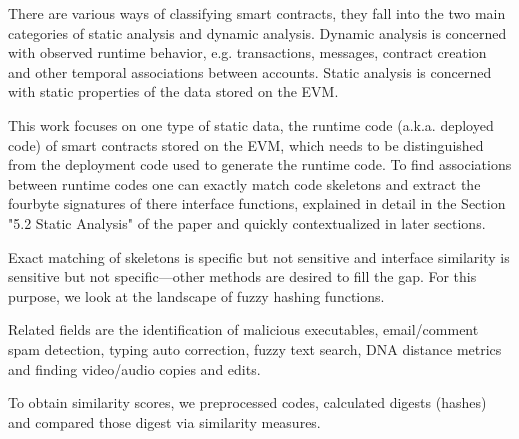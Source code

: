 \documentclass[../main.tex]{subfiles}
\begin{document}
There are various ways of classifying smart contracts, they fall into the two main categories of
static analysis and dynamic analysis.
Dynamic analysis is concerned with observed runtime behavior, e.g. transactions, messages, contract creation and other temporal associations between accounts.
Static analysis is concerned with static properties of the data stored on the EVM.

This work focuses on one type of static data, the runtime code (a.k.a. deployed code) of smart contracts stored on the EVM, which needs to be distinguished from the deployment code used to generate the runtime code.
To find associations between runtime codes one can exactly match code skeletons  and extract the fourbyte signatures  of there interface functions, explained in detail in the Section "5.2 Static Analysis" of the paper  and quickly contextualized in later sections.

Exact matching of skeletons is specific but not sensitive and interface similarity is sensitive but not specific---other methods are desired to fill the gap. For this purpose, we look at the landscape of fuzzy hashing functions.

Related fields are the identification of malicious executables, email/comment spam detection, typing auto correction, fuzzy text search, DNA distance metrics and finding video/audio copies and edits.

To obtain similarity scores, we preprocessed codes, calculated digests (hashes) and compared those digest via similarity measures.

\end{document}

